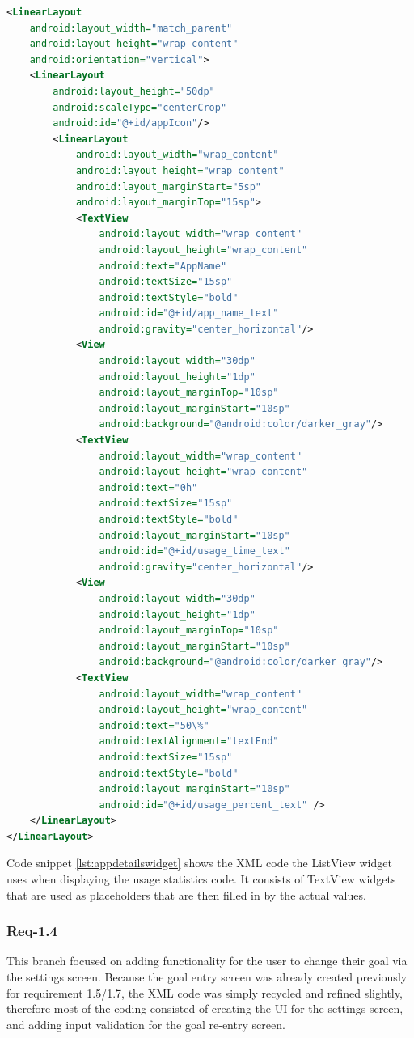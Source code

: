 \documentclass[12pt]{article}
\begin{document}
\begin{lstlisting}[language=XML, style=mystyle, caption={XML code used by the ListView widget for displaying code}, label=lst:appdetailswidget]
<LinearLayout
	android:layout_width="match_parent"
	android:layout_height="wrap_content"
	android:orientation="vertical">
	<LinearLayout
		android:layout_height="50dp"
		android:scaleType="centerCrop"
		android:id="@+id/appIcon"/>
		<LinearLayout
			android:layout_width="wrap_content"
			android:layout_height="wrap_content"
			android:layout_marginStart="5sp"
			android:layout_marginTop="15sp">
			<TextView
				android:layout_width="wrap_content"
				android:layout_height="wrap_content"
				android:text="AppName"
				android:textSize="15sp"
				android:textStyle="bold"
				android:id="@+id/app_name_text"
				android:gravity="center_horizontal"/>
			<View
				android:layout_width="30dp"
				android:layout_height="1dp"
				android:layout_marginTop="10sp"
				android:layout_marginStart="10sp"
				android:background="@android:color/darker_gray"/>
			<TextView
				android:layout_width="wrap_content"
				android:layout_height="wrap_content"
				android:text="0h"
				android:textSize="15sp"
				android:textStyle="bold"
				android:layout_marginStart="10sp"
				android:id="@+id/usage_time_text"
				android:gravity="center_horizontal"/>
			<View
				android:layout_width="30dp"
				android:layout_height="1dp"
				android:layout_marginTop="10sp"
				android:layout_marginStart="10sp"
				android:background="@android:color/darker_gray"/>
			<TextView
				android:layout_width="wrap_content"
				android:layout_height="wrap_content"
				android:text="50\%"
				android:textAlignment="textEnd"
				android:textSize="15sp"
				android:textStyle="bold"
				android:layout_marginStart="10sp"
				android:id="@+id/usage_percent_text" />
	</LinearLayout>
</LinearLayout>
\end{lstlisting}

Code snippet \ref{lst:appdetailswidget} shows the XML code the ListView widget uses when displaying the usage statistics code. It consists of TextView widgets that are used as placeholders that are then
filled in by the actual values. 


\subsubsection{Req-1.4}
This branch focused on adding functionality for the user to change their goal via the settings screen. Because the goal entry screen was already created previously for requirement 1.5/1.7, the XML
code was simply recycled and refined slightly, therefore most of the coding consisted of creating the UI for the settings screen, and adding input validation for the goal re-entry screen.
\end{document}
